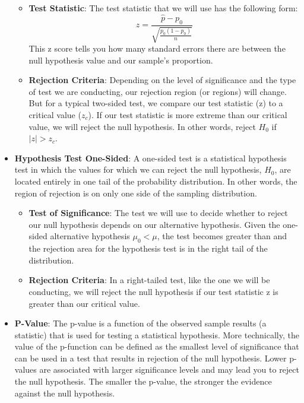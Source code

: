 \documentclass{article}
\begin{document}
\begin{itemize}
\begin{itemize}
\item \textbf{Test Statistic}: The test statistic that we will use has the following form: 
\[ z = \frac{\hat{p} - p_0}{\sqrt{\frac{p_0(1-p_0)}{n}}} \]
This z score tells you how many standard errors there are between the null hypothesis value and our sample's proportion.

\item \textbf{Rejection Criteria}:  Depending on the level of significance and the type of test we are conducting, our rejection region (or regions) will change. But for a typical two-sided test, we compare our test statistic (z) to a critical value ($z_c$). If our test statistic is more extreme than our critical value, we will reject the null hypothesis. In other words, reject $H_0$ if $|z| > z_c$.

\end{itemize}

\item \textbf{Hypothesis Test One-Sided}: A one-sided test is a statistical hypothesis test in which the values for which we can reject the null hypothesis, $H_0$, are located entirely in one tail of the probability distribution. In other words, the region of rejection is on only one side of the sampling distribution.

\begin{itemize}

\item \textbf{Test of Significance}: The test we will use to decide whether to reject our null hypothesis depends on our alternative hypothesis. Given the one-sided alternative hypothesis $\mu_0 < \mu $, the test becomes greater than and the rejection area for the hypothesis test is in the right tail of the distribution.

\item \textbf{Rejection Criteria}: In a right-tailed test, like the one we will be conducting, we will reject the null hypothesis if our test statistic z is greater than our critical value. 

\end{itemize}

\item \textbf{P-Value}: The p-value is a function of the observed sample results (a statistic) that is used for testing a statistical hypothesis. More technically, the value of the p-function can be defined as the smallest level of significance that can be used in a test that results in rejection of the null hypothesis. Lower p-values are associated with larger significance levels and may lead you to reject the null hypothesis. The smaller the p-value, the stronger the evidence against the null hypothesis.


\end{itemize}
\end{document}
